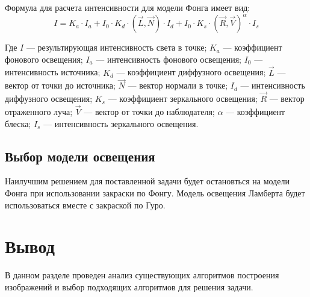 Формула для расчета интенсивности для модели Фонга имеет вид:
\begin{equation}
    I = K_a \cdot I_a + I_0 \cdot K_d \cdot (\vec{L}, \vec{N}) \cdot I_d + I_0 \cdot K_s \cdot (\vec{R}, \vec{V})^\alpha \cdot I_s
\end{equation}

Где $I$ --- результирующая интенсивность света в точке; 
$K_a$ --- коэффициент фонового освещения; 
$I_a$ --- интенсивность фонового освещения; 
$I_0$ --- интенсивность источника; 
$K_d$ --- коэффициент диффузного освещения; 
$\vec{L}$ --- вектор от точки до источника; 
$\vec{N}$ --- вектор нормали в точке; 
$I_d$ --- интенсивность диффузного освещения; 
$K_s$ --- коэффициент зеркального освещения; 
$\vec{R}$ --- вектор отраженного луча; 
$\vec{V}$ --- вектор от точки до наблюдателя; 
$\alpha$ --- коэффициент блеска; 
$I_s$ --- интенсивность зеркального освещения.


\subsection{Выбор модели освещения}
Наилучшим решением для поставленной задачи будет остановться на модели Фонга при использовании закраски по Фонгу.
Модель освещения Ламберта будет использоваться вместе с закраской по Гуро. 

\section*{Вывод}
В данном разделе проведен анализ существующих алгоритмов построения изображений и выбор подходящих алгоритмов для решения задачи.
